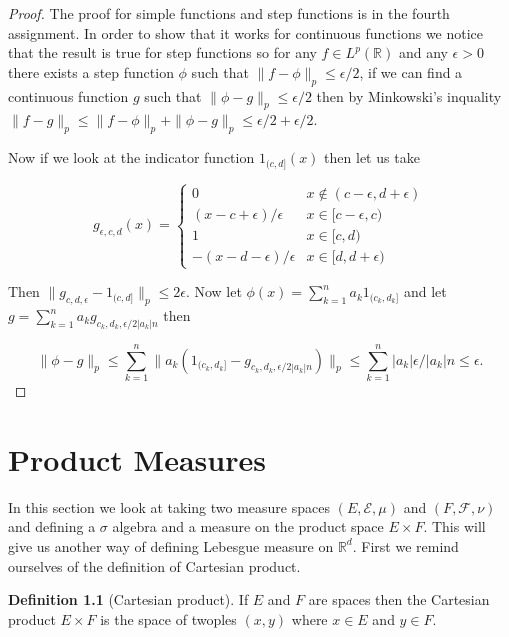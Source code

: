 \documentclass[
]{book}
\theoremstyle{definition}
\newtheorem{definition}{Definition}[chapter]
\theoremstyle{definition}
\theoremstyle{definition}
\theoremstyle{definition}
\theoremstyle{remark}
\begin{document}
\begin{proof}
The proof for simple functions and step functions is in the fourth assignment. In order to show that it works for continuous functions we notice that the result is true for step functions so for any \(f \in L^p(\mathbb{R})\) and any \(\epsilon >0\) there exists a step function \(\phi\) such that \(\| f-\phi\|_p \leq \epsilon/2\), if we can find a continuous function \(g\) such that \(\|\phi-g\|_p \leq \epsilon/2\) then by Minkowski's inquality \(\|f-g\|_p \leq \|f-\phi\|_p + \|\phi - g\|_p \leq \epsilon/2 + \epsilon/2\).

Now if we look at the indicator function \(1_{(c,d]}(x)\) then let us take

\[ g_{\epsilon, c,d}(x) = \left\{ \begin{array}{ll} 0 & x \notin (c-\epsilon, d+\epsilon) \\ (x-c+ \epsilon)/\epsilon & x \in [c-\epsilon, c) \\ 1 & x \in [c,d) \\ -(x-d -\epsilon)/\epsilon & x \in [d, d+\epsilon) \end{array} \right. \]

Then \(\|g_{c,d,\epsilon}-1_{(c,d]}\|_p \leq 2\epsilon\). Now let \(\phi(x) = \sum_{k=1}^n a_k 1_{(c_k,d_k]}\) and let \(g = \sum_{k=1}^n a_k g_{c_k, d_k, \epsilon/2|a_k| n}\) then

\[ \| \phi - g\|_p \leq \sum_{k=1}^n \| a_k (1_{(c_k, d_k]} - g_{c_k, d_k, \epsilon/2|a_k|n})\|_p \leq \sum_{k=1}^n |a_k| \epsilon/|a_k| n \leq \epsilon.  \]
\end{proof}

\hypertarget{product-measures}{%
\chapter{Product Measures}\label{product-measures}}

In this section we look at taking two measure spaces \((E, \mathcal{E}, \mu)\) and \((F, \mathcal{F}, \nu)\) and defining a \(\sigma\) algebra and a measure on the product space \(E \times F\). This will give us another way of defining Lebesgue measure on \(\mathbb{R}^d\). First we remind ourselves of the definition of Cartesian product.

\begin{definition}[Cartesian product]
If \(E\) and \(F\) are spaces then the Cartesian product \(E \times F\) is the space of twoples \((x,y)\) where \(x \in E\) and \(y \in F\).
\end{definition}
\end{document}
